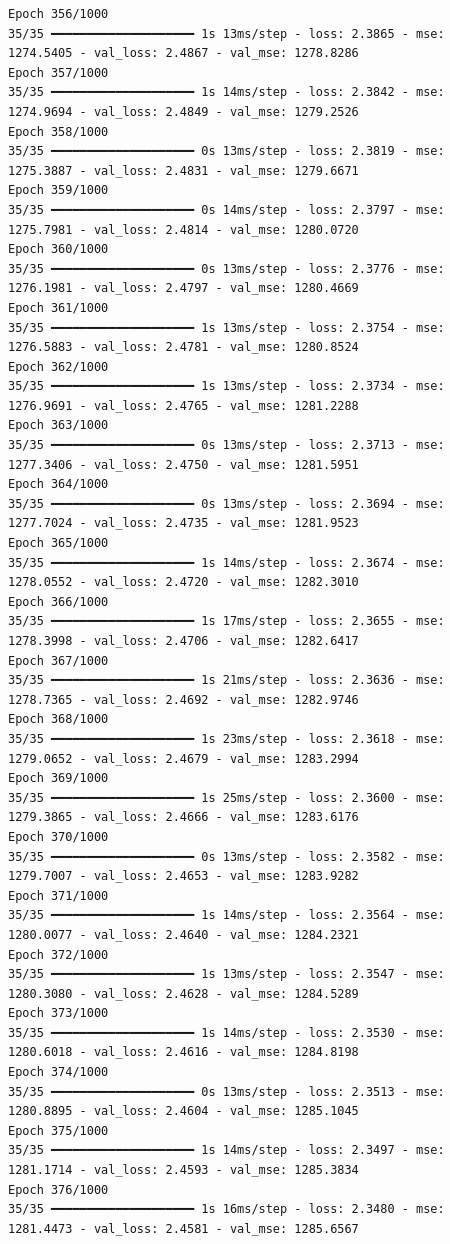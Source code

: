 \documentclass[
  letterpaper,
  DIV=11,
  numbers=noendperiod]{scrreprt}
\begin{document}
\begin{verbatim}
Epoch 356/1000
35/35 ━━━━━━━━━━━━━━━━━━━━ 1s 13ms/step - loss: 2.3865 - mse: 1274.5405 - val_loss: 2.4867 - val_mse: 1278.8286
Epoch 357/1000
35/35 ━━━━━━━━━━━━━━━━━━━━ 1s 14ms/step - loss: 2.3842 - mse: 1274.9694 - val_loss: 2.4849 - val_mse: 1279.2526
Epoch 358/1000
35/35 ━━━━━━━━━━━━━━━━━━━━ 0s 13ms/step - loss: 2.3819 - mse: 1275.3887 - val_loss: 2.4831 - val_mse: 1279.6671
Epoch 359/1000
35/35 ━━━━━━━━━━━━━━━━━━━━ 0s 14ms/step - loss: 2.3797 - mse: 1275.7981 - val_loss: 2.4814 - val_mse: 1280.0720
Epoch 360/1000
35/35 ━━━━━━━━━━━━━━━━━━━━ 0s 13ms/step - loss: 2.3776 - mse: 1276.1981 - val_loss: 2.4797 - val_mse: 1280.4669
Epoch 361/1000
35/35 ━━━━━━━━━━━━━━━━━━━━ 1s 13ms/step - loss: 2.3754 - mse: 1276.5883 - val_loss: 2.4781 - val_mse: 1280.8524
Epoch 362/1000
35/35 ━━━━━━━━━━━━━━━━━━━━ 1s 13ms/step - loss: 2.3734 - mse: 1276.9691 - val_loss: 2.4765 - val_mse: 1281.2288
Epoch 363/1000
35/35 ━━━━━━━━━━━━━━━━━━━━ 0s 13ms/step - loss: 2.3713 - mse: 1277.3406 - val_loss: 2.4750 - val_mse: 1281.5951
Epoch 364/1000
35/35 ━━━━━━━━━━━━━━━━━━━━ 0s 13ms/step - loss: 2.3694 - mse: 1277.7024 - val_loss: 2.4735 - val_mse: 1281.9523
Epoch 365/1000
35/35 ━━━━━━━━━━━━━━━━━━━━ 1s 14ms/step - loss: 2.3674 - mse: 1278.0552 - val_loss: 2.4720 - val_mse: 1282.3010
Epoch 366/1000
35/35 ━━━━━━━━━━━━━━━━━━━━ 1s 17ms/step - loss: 2.3655 - mse: 1278.3998 - val_loss: 2.4706 - val_mse: 1282.6417
Epoch 367/1000
35/35 ━━━━━━━━━━━━━━━━━━━━ 1s 21ms/step - loss: 2.3636 - mse: 1278.7365 - val_loss: 2.4692 - val_mse: 1282.9746
Epoch 368/1000
35/35 ━━━━━━━━━━━━━━━━━━━━ 1s 23ms/step - loss: 2.3618 - mse: 1279.0652 - val_loss: 2.4679 - val_mse: 1283.2994
Epoch 369/1000
35/35 ━━━━━━━━━━━━━━━━━━━━ 1s 25ms/step - loss: 2.3600 - mse: 1279.3865 - val_loss: 2.4666 - val_mse: 1283.6176
Epoch 370/1000
35/35 ━━━━━━━━━━━━━━━━━━━━ 0s 13ms/step - loss: 2.3582 - mse: 1279.7007 - val_loss: 2.4653 - val_mse: 1283.9282
Epoch 371/1000
35/35 ━━━━━━━━━━━━━━━━━━━━ 1s 14ms/step - loss: 2.3564 - mse: 1280.0077 - val_loss: 2.4640 - val_mse: 1284.2321
Epoch 372/1000
35/35 ━━━━━━━━━━━━━━━━━━━━ 1s 13ms/step - loss: 2.3547 - mse: 1280.3080 - val_loss: 2.4628 - val_mse: 1284.5289
Epoch 373/1000
35/35 ━━━━━━━━━━━━━━━━━━━━ 1s 14ms/step - loss: 2.3530 - mse: 1280.6018 - val_loss: 2.4616 - val_mse: 1284.8198
Epoch 374/1000
35/35 ━━━━━━━━━━━━━━━━━━━━ 0s 13ms/step - loss: 2.3513 - mse: 1280.8895 - val_loss: 2.4604 - val_mse: 1285.1045
Epoch 375/1000
35/35 ━━━━━━━━━━━━━━━━━━━━ 1s 14ms/step - loss: 2.3497 - mse: 1281.1714 - val_loss: 2.4593 - val_mse: 1285.3834
Epoch 376/1000
35/35 ━━━━━━━━━━━━━━━━━━━━ 1s 16ms/step - loss: 2.3480 - mse: 1281.4473 - val_loss: 2.4581 - val_mse: 1285.6567

\end{verbatim}
\end{document}
